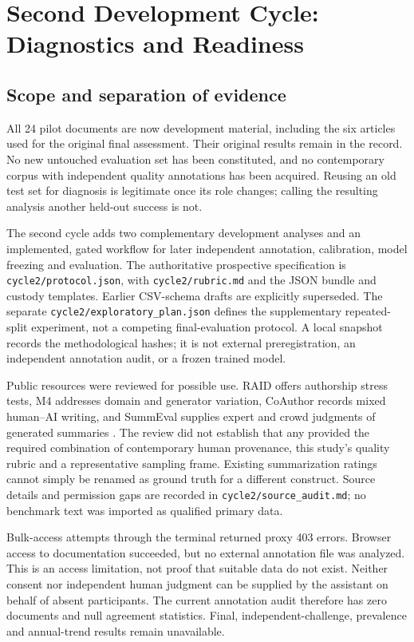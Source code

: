 \section{Second Development Cycle: Diagnostics and Readiness}
\subsection{Scope and separation of evidence}
All 24 pilot documents are now development material, including the six articles
used for the original final assessment. Their original results remain in the
record. No new untouched evaluation set has been constituted, and no contemporary
corpus with independent quality annotations has been acquired. Reusing an old
test set for diagnosis is legitimate once its role changes; calling the resulting
analysis another held-out success is not.

The second cycle adds two complementary development analyses and an implemented,
gated workflow for later independent annotation, calibration, model freezing and
evaluation. The authoritative prospective specification is
\texttt{cycle2/protocol.json}, with \texttt{cycle2/rubric.md} and the JSON bundle
and custody templates. Earlier CSV-schema drafts are explicitly superseded.
The separate \texttt{cycle2/exploratory\_plan.json} defines the supplementary
repeated-split experiment, not a competing final-evaluation protocol. A local
snapshot records the methodological hashes; it is not external preregistration,
an independent annotation audit, or a frozen trained model.

Public resources were reviewed for possible use. RAID offers authorship stress
tests, M4 addresses domain and generator variation, CoAuthor records mixed
human--AI writing, and SummEval supplies expert and crowd judgments of generated
summaries \cite{raid,m4,coauthor,summeval}. The review did not establish that any
provided the required combination of contemporary human provenance, this study's
quality rubric and a representative sampling frame. Existing summarization
ratings cannot simply be renamed as ground truth for a different construct.
Source details and permission gaps are recorded in
\texttt{cycle2/source\_audit.md}; no benchmark text was imported as qualified
primary data.

Bulk-access attempts through the terminal returned proxy 403 errors. Browser
access to documentation succeeded, but no external annotation file was analyzed.
This is an access limitation, not proof that suitable data do not exist.
Neither consent nor independent human judgment can be supplied by the assistant
on behalf of absent participants. The current annotation audit therefore has
zero documents and null agreement statistics. Final, independent-challenge,
prevalence and annual-trend results remain unavailable.

